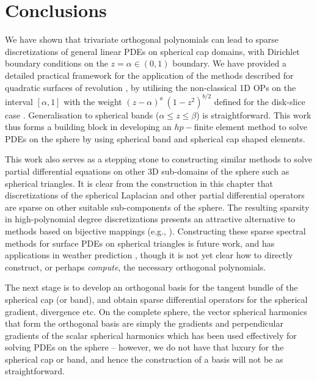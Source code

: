 %
\section{Conclusions}

We have shown that trivariate orthogonal polynomials can lead to sparse discretizations of general linear PDEs on spherical cap domains, with Dirichlet boundary conditions on the $z = \alpha \in (0,1)$ boundary. We have provided a detailed practical framework for the application of the methods described for quadratic surfaces of revolution \cite{olver2020orthogonal}, by utilising the non-classical 1D OPs on the interval $[\alpha, 1]$ with the weight $(z - \alpha)^a \: (1-z^2)^{b/2}$ defined for the disk-slice case \cite{snowball2019sparse}. Generalisation to spherical bands ($\alpha \leq z \leq \beta$) is straightforward.  This work thus forms a building block in developing an $hp-$finite element method to solve PDEs on the sphere by using spherical band and spherical cap shaped elements.

This work also serves as a stepping stone to constructing similar methods to solve partial differential equations on other 3D sub-domains of the sphere such as spherical triangles. It is clear from the construction in this chapter that discretizations of the spherical Laplacian and other partial differential operators are sparse on other suitable sub-components of the sphere. The resulting sparsity in high-polynomial degree discretizations presents an attractive alternative to methods based on bijective mappings (e.g., \cite{DGShallowWater,FEMShallowWater,boyd2005sphere}). Constructing these sparse spectral methods for surface PDEs on spherical triangles is future work, and has applications in weather prediction \cite{staniforth2012horizontal}, though it is not yet clear how to directly construct, or perhaps \textit{compute}, the necessary orthogonal polynomials. 

The next stage is to develop an orthogonal basis for the tangent bundle of the spherical cap (or band), and obtain sparse differential operators for the spherical gradient, divergence etc. On the complete sphere, the vector spherical harmonics that form the orthogonal basis are simply the gradients and perpendicular gradients of the scalar spherical harmonics \cite{barrera1985vector} which has been used effectively for solving PDEs on the sphere \cite{vasil2019tensor,lecoanet2019tensor} -- however, we do not have that luxury for the spherical cap or band, and hence the construction of a basis will not be as straightforward.







  







